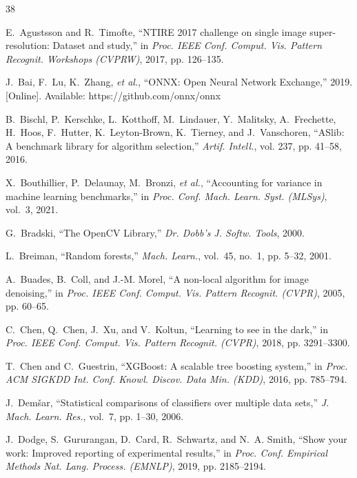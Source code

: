 \documentclass[journal]{IEEEtran}
\begin{document}

\begin{thebibliography}{38}

E.~Agustsson and R.~Timofte, ``NTIRE 2017 challenge on single image super-resolution: Dataset and study,'' in \emph{Proc. IEEE Conf. Comput. Vis. Pattern Recognit. Workshops (CVPRW)}, 2017, pp. 126--135.

J.~Bai, F.~Lu, K.~Zhang, \emph{et al.}, ``ONNX: Open Neural Network Exchange,'' 2019. [Online]. Available: https://github.com/onnx/onnx

B.~Bischl, P.~Kerschke, L.~Kotthoff, M.~Lindauer, Y.~Malitsky, A.~Frechette, H.~Hoos, F.~Hutter, K.~Leyton-Brown, K.~Tierney, and J.~Vanschoren, ``ASlib: A benchmark library for algorithm selection,'' \emph{Artif. Intell.}, vol. 237, pp. 41--58, 2016.

X.~Bouthillier, P.~Delaunay, M.~Bronzi, \emph{et al.}, ``Accounting for variance in machine learning benchmarks,'' in \emph{Proc. Conf. Mach. Learn. Syst. (MLSys)}, vol.~3, 2021.

G.~Bradski, ``The OpenCV Library,'' \emph{Dr. Dobb's J. Softw. Tools}, 2000.

L.~Breiman, ``Random forests,'' \emph{Mach. Learn.}, vol.~45, no.~1, pp. 5--32, 2001.

A.~Buades, B.~Coll, and J.-M. Morel, ``A non-local algorithm for image denoising,'' in \emph{Proc. IEEE Conf. Comput. Vis. Pattern Recognit. (CVPR)}, 2005, pp. 60--65.

C.~Chen, Q.~Chen, J.~Xu, and V.~Koltun, ``Learning to see in the dark,'' in \emph{Proc. IEEE Conf. Comput. Vis. Pattern Recognit. (CVPR)}, 2018, pp. 3291--3300.

T.~Chen and C.~Guestrin, ``XGBoost: A scalable tree boosting system,'' in \emph{Proc. ACM SIGKDD Int. Conf. Knowl. Discov. Data Min. (KDD)}, 2016, pp. 785--794.

J.~Dem\v{s}ar, ``Statistical comparisons of classifiers over multiple data sets,'' \emph{J. Mach. Learn. Res.}, vol.~7, pp. 1--30, 2006.

J.~Dodge, S.~Gururangan, D.~Card, R.~Schwartz, and N.~A. Smith, ``Show your work: Improved reporting of experimental results,'' in \emph{Proc. Conf. Empirical Methods Nat. Lang. Process. (EMNLP)}, 2019, pp. 2185--2194.


\end{thebibliography}
\end{document}
